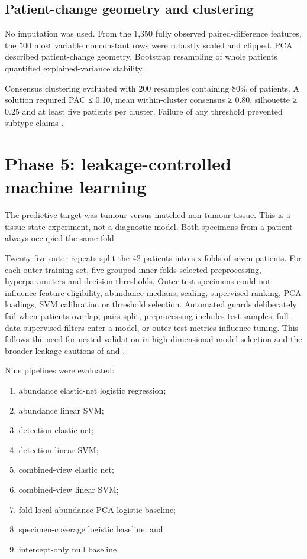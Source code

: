 \subsection{Patient-change geometry and clustering}

No imputation was used. From the 1,350 fully observed paired-difference features, the 500 most variable nonconstant rows were robustly scaled and clipped. PCA described patient-change geometry. Bootstrap resampling of whole patients quantified explained-variance stability.

Consensus clustering evaluated \texttt{} with 200 resamples containing 80\% of patients. A solution required PAC ≤ 0.10, mean within-cluster consensus ≥ 0.80, silhouette ≥ 0.25 and at least five patients per cluster. Failure of any threshold prevented subtype claims \parencite{monti2003,senbabaoglu2014}.

\section{Phase 5: leakage-controlled machine learning}
\label{sec:phase_5_leakage_controlled_machine_learning}

The predictive target was tumour versus matched non-tumour tissue. This is a tissue-state experiment, not a diagnostic model. Both specimens from a patient always occupied the same fold.

Twenty-five outer repeats split the 42 patients into six folds of seven patients. For each outer training set, five grouped inner folds selected preprocessing, hyperparameters and decision thresholds. Outer-test specimens could not influence feature eligibility, abundance medians, scaling, supervised ranking, PCA loadings, SVM calibration or threshold selection. Automated guards deliberately fail when patients overlap, pairs split, preprocessing includes test samples, full-data supervised filters enter a model, or outer-test metrics influence tuning. This follows the need for nested validation in high-dimensional model selection \parencite{varma2006,lewis2023} and the broader leakage cautions of \textcite{davis2023} and \textcite{kapoor2023}.

Nine pipelines were evaluated:

\begin{enumerate}
\item abundance elastic-net logistic regression;
\item abundance linear SVM;
\item detection elastic net;
\item detection linear SVM;
\item combined-view elastic net;
\item combined-view linear SVM;
\item fold-local abundance PCA logistic baseline;
\item specimen-coverage logistic baseline; and
\item intercept-only null baseline.
\end{enumerate}

